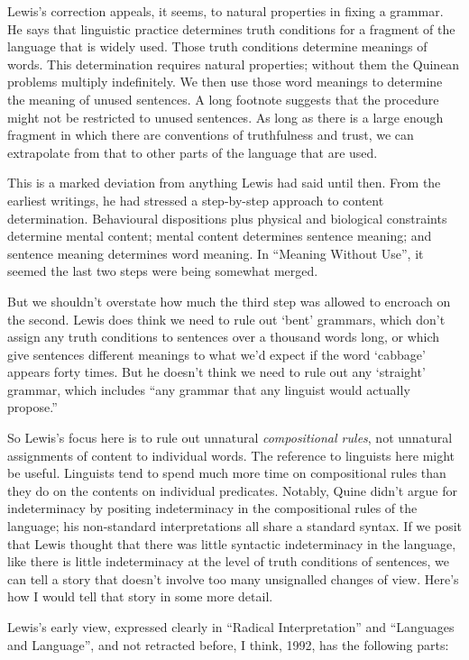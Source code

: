 Lewis's correction appeals, it seems, to natural properties in fixing a grammar. He says that linguistic practice determines truth conditions for a fragment of the language that is widely used. Those truth conditions determine meanings of words. This determination requires natural properties; without them the Quinean problems multiply indefinitely. We then use those word meanings to determine the meaning of unused sentences. A long footnote suggests that the procedure might not be restricted to unused sentences. As long as there is a large enough fragment in which there are conventions of truthfulness and trust, we can extrapolate from that to other parts of the language that are used.

This is a marked deviation from anything Lewis had said until then. From the earliest writings, he had stressed a step-by-step approach to content determination. Behavioural dispositions plus physical and biological constraints determine mental content; mental content determines sentence meaning; and sentence meaning determines word meaning. In ``Meaning Without Use'', it seemed the last two steps were being somewhat merged.

But we shouldn't overstate how much the third step was allowed to encroach on the second. Lewis does think we need to rule out `bent' grammars, which don't assign any truth conditions to sentences over a thousand words long, or which give sentences different meanings to what we'd expect if the word `cabbage' appears forty times. But he doesn't think we need to rule out any `straight' grammar, which includes ``any grammar that any linguist would actually propose.'' \citep[109]{Lewis1992a}

So Lewis's focus here is to rule out unnatural \textit{compositional rules}, not unnatural assignments of content to individual words. The reference to linguists here might be useful. Linguists tend to spend much more time on compositional rules than they do on the contents on individual predicates. Notably, Quine didn't argue for indeterminacy by positing indeterminacy in the compositional rules of the language; his non-standard interpretations all share a standard syntax. If we posit that Lewis thought that there was little syntactic indeterminacy in the language, like there is little indeterminacy at the level of truth conditions of sentences, we can tell a story that doesn't involve too many unsignalled changes of view. Here's how I would tell that story in some more detail.

Lewis's early view, expressed clearly in ``Radical Interpretation'' and ``Languages and Language'', and not retracted before, I think, 1992, has the following parts:

